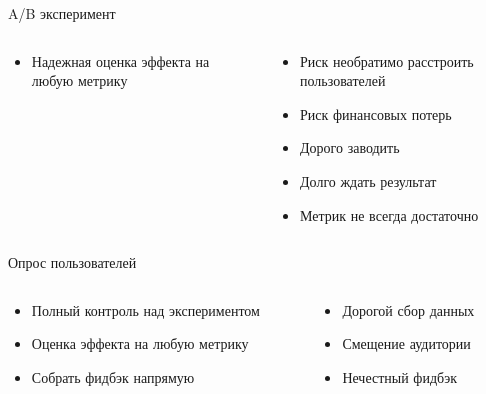 \documentclass[11pt,aspectratio=169,handout]{beamer}
\begin{document}
\begin{frame}{A/B эксперимент \cite{RSHB}}

\begin{columns}
\begin{column}{0.47\textwidth}
   \begin{tcolorbox}[colback=info!5,colframe=info!80,title=Плюсы]
      \begin{itemize}
      \item Надежная оценка эффекта на любую метрику
      \end{itemize}
    \end{tcolorbox}
\end{column}
\begin{column}{0.47\textwidth}
    \begin{tcolorbox}[colback=warn!5,colframe=warn!80,title=Минусы]
      \begin{itemize}
       \item Риск необратимо расстроить пользователей
       \item Риск финансовых потерь
       \item Дорого заводить
       \item Долго ждать результат
       \item Метрик не всегда достаточно
      \end{itemize}
    \end{tcolorbox}
\end{column}
\end{columns}

\end{frame}

\begin{frame}{Опрос пользователей}

\begin{columns}
\begin{column}{0.47\textwidth}
   \begin{tcolorbox}[colback=info!5,colframe=info!80,title=Плюсы]
      \begin{itemize}
      \item Полный контроль над экспериментом
      \item Оценка эффекта на любую метрику
      \item Собрать фидбэк напрямую
      \end{itemize}
    \end{tcolorbox}
\end{column}
\begin{column}{0.47\textwidth}
    \begin{tcolorbox}[colback=warn!5,colframe=warn!80,title=Минусы]
      \begin{itemize}
       \item Дорогой сбор данных
       \item Смещение аудитории
       \item Нечестный фидбэк
      \end{itemize}
    \end{tcolorbox}
\end{column}
\end{columns}

\end{frame}
\end{document}
